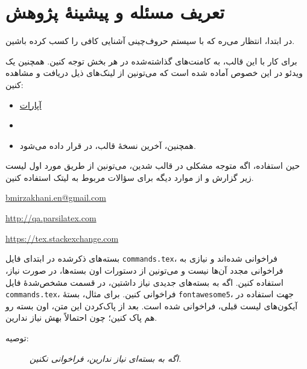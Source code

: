 \section{تعریف مسئله و پیشینۀ پژوهش}

در ابتدا، انتظار می‌ره که با سیستم حروف‌چینی
\lr{\LaTeX}
آشنایی کافی را کسب کرده باشین.

برای کار با این قالب، به کامنت‌های گذاشته‌شده در هر بخش توجه کنین. همچنین یک ویدئو در این خصوص آماده
شده است که می‌تونین از لینک‌های ذیل دریافت و مشاهده کنین:
\begin{itemize}
	\item \href{https://www.aparat.com/Bahman_Mirzakhani/playlists}{آپارات}
	\item\href{https://www.youtube.com/channel/UCzZoLZNsM9utoqycWoG7f5A/featured}{}
	\item
	همچنین، آخرین نسخهٔ قالب، در
	\href{https://github.com/bahman-mirzakhani/znu-enj-proposal.git}{}
	قرار داده می‌شود.
\end{itemize}
حین استفاده، اگه متوجه مشکلی در قالب شدین، می‌تونین از طریق مورد اول لیست
زیر گزارش و از موارد دیگه برای سؤالات مربوط به لیتک استفاده کنین.
\begin{itemize}
\end{itemize}

بسته‌های ذکرشده در ابتدای فایل
\texttt{commands.tex}،
فراخوانی شده‌اند و نیازی به فراخوانی مجدد آن‌ها نیست و می‌تونین از دستورات اون بسته‌ها،
در صورت نیاز، استفاده کنین. اگه به بسته‌های جدیدی نیاز داشتین، در قسمت مشخص‌شدهٔ
فایل
\texttt{commands.tex}،
فراخوانی کنین. برای مثال، بستۀ
\texttt{fontawesome5}،
جهت استفاده در آیکون‌های لیست قبلی، فراخوانی شده است. بعد از پاک‌کردن این متن،
اون بسته رو هم پاک کنین؛ چون احتمالاً بهش نیاز ندارین.

\begin{description}
\item[توصیه:] \itshape
اگه به بسته‌ای نیاز ندارین، فراخوانی نکنین.
\end{description}

